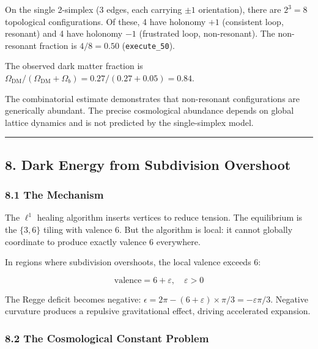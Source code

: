 \documentclass[
]{article}
\begin{document}
On the single 2-simplex (3 edges, each carrying \(\pm 1\) orientation),
there are \(2^3 = 8\) topological configurations. Of these, 4 have
holonomy \(+1\) (consistent loop, resonant) and 4 have holonomy \(-1\)
(frustrated loop, non-resonant). The non-resonant fraction is
\(4/8 = 0.50\) (\texttt{execute\_50}).

The observed dark matter fraction is
\(\Omega_{\mathrm{DM}} / (\Omega_{\mathrm{DM}} + \Omega_b) = 0.27 / (0.27 + 0.05) = 0.84\).

The combinatorial estimate demonstrates that non-resonant configurations
are generically abundant. The precise cosmological abundance depends on
global lattice dynamics and is not predicted by the single-simplex
model.

\begin{center}\rule{0.5\linewidth}{0.5pt}\end{center}

\hypertarget{dark-energy-from-subdivision-overshoot}{%
\subsection{8. Dark Energy from Subdivision
Overshoot}\label{dark-energy-from-subdivision-overshoot}}

\hypertarget{the-mechanism}{%
\subsubsection{8.1 The Mechanism}\label{the-mechanism}}

The \(\ell^1\) healing algorithm inserts vertices to reduce tension. The
equilibrium is the \(\{3,6\}\) tiling with valence 6. But the algorithm
is local: it cannot globally coordinate to produce exactly valence 6
everywhere.

In regions where subdivision overshoots, the local valence exceeds 6:

\[\text{valence} = 6 + \varepsilon, \quad \varepsilon > 0\]

The Regge deficit becomes negative:
\(\epsilon = 2\pi - (6 + \varepsilon) \times \pi/3 = -\varepsilon\pi/3\).
Negative curvature produces a repulsive gravitational effect, driving
accelerated expansion.

\hypertarget{the-cosmological-constant-problem}{%
\subsubsection{8.2 The Cosmological Constant
Problem}\label{the-cosmological-constant-problem}}
\end{document}
